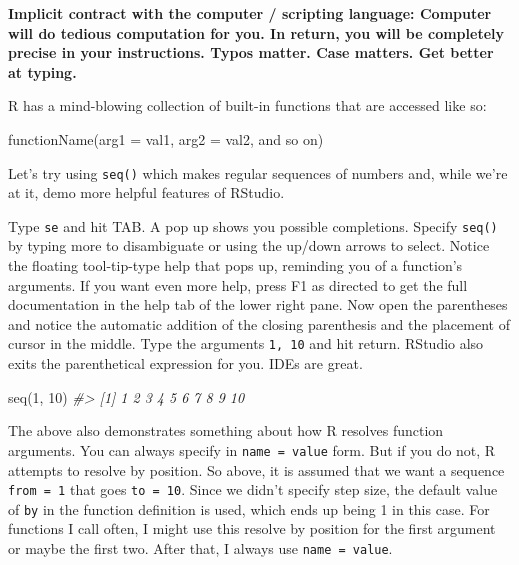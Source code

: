 \documentclass[
]{book}
\newenvironment{Shaded}{\begin{snugshade}}{\end{snugshade}}
\newcommand{\AttributeTok}[1]{\textcolor[rgb]{0.77,0.63,0.00}{#1}}
\newcommand{\CommentTok}[1]{\textcolor[rgb]{0.56,0.35,0.01}{\textit{#1}}}
\newcommand{\DecValTok}[1]{\textcolor[rgb]{0.00,0.00,0.81}{#1}}
\newcommand{\FunctionTok}[1]{\textcolor[rgb]{0.00,0.00,0.00}{#1}}
\newcommand{\NormalTok}[1]{#1}
\begin{document}
\textbf{Implicit contract with the computer / scripting language: Computer will do tedious computation for you. In return, you will be completely precise in your instructions. Typos matter. Case matters. Get better at typing.}

R has a mind-blowing collection of built-in functions that are accessed like so:

\begin{Shaded}
\begin{Highlighting}[]
\FunctionTok{functionName}\NormalTok{(}\AttributeTok{arg1 =}\NormalTok{ val1, }\AttributeTok{arg2 =}\NormalTok{ val2, and so on)}
\end{Highlighting}
\end{Shaded}

Let's try using \texttt{seq()} which makes regular sequences of numbers and, while we're at it, demo more helpful features of RStudio.

Type \texttt{se} and hit TAB. A pop up shows you possible completions. Specify \texttt{seq()} by typing more to disambiguate or using the up/down arrows to select. Notice the floating tool-tip-type help that pops up, reminding you of a function's arguments. If you want even more help, press F1 as directed to get the full documentation in the help tab of the lower right pane. Now open the parentheses and notice the automatic addition of the closing parenthesis and the placement of cursor in the middle. Type the arguments \texttt{1,\ 10} and hit return. RStudio also exits the parenthetical expression for you. IDEs are great.

\begin{Shaded}
\begin{Highlighting}[]
\FunctionTok{seq}\NormalTok{(}\DecValTok{1}\NormalTok{, }\DecValTok{10}\NormalTok{)}
\CommentTok{\#\textgreater{}  [1]  1  2  3  4  5  6  7  8  9 10}
\end{Highlighting}
\end{Shaded}

The above also demonstrates something about how R resolves function arguments. You can always specify in \texttt{name\ =\ value} form. But if you do not, R attempts to resolve by position. So above, it is assumed that we want a sequence \texttt{from\ =\ 1} that goes \texttt{to\ =\ 10}. Since we didn't specify step size, the default value of \texttt{by} in the function definition is used, which ends up being 1 in this case. For functions I call often, I might use this resolve by position for the first
argument or maybe the first two. After that, I always use \texttt{name\ =\ value}.
\end{document}
